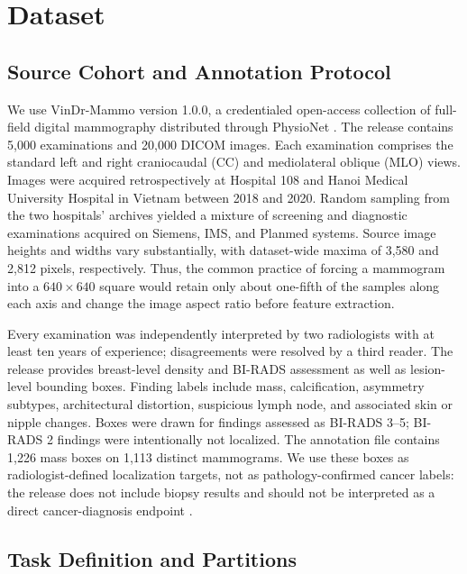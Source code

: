 \section{Dataset}
\label{sec:dataset}

\subsection{Source Cohort and Annotation Protocol}
\label{sec:dataset_source}

We use VinDr-Mammo version 1.0.0, a credentialed open-access collection of
full-field digital mammography distributed through PhysioNet
\cite{nguyen2023vindr,pham2022vindrphysionet}.  The release contains 5,000
examinations and 20,000 DICOM images.  Each examination comprises the standard
left and right craniocaudal (CC) and mediolateral oblique (MLO) views.  Images
were acquired retrospectively at Hospital 108 and Hanoi Medical University
Hospital in Vietnam between 2018 and 2020.  Random sampling from the two
hospitals' archives yielded a mixture of screening and diagnostic examinations
acquired on Siemens, IMS, and Planmed systems.  Source image heights and widths
vary substantially, with dataset-wide maxima of 3,580 and 2,812 pixels,
respectively.  Thus, the common practice of forcing a mammogram into a
$640\!\times\!640$ square would retain only about one-fifth of the samples
along each axis and change the image aspect ratio before feature extraction.

Every examination was independently interpreted by two radiologists with at
least ten years of experience; disagreements were resolved by a third reader.
The release provides breast-level density and BI-RADS assessment as well as
lesion-level bounding boxes.  Finding labels include mass, calcification,
asymmetry subtypes, architectural distortion, suspicious lymph node, and
associated skin or nipple changes.  Boxes were drawn for findings assessed as
BI-RADS 3--5; BI-RADS 2 findings were intentionally not localized.  The
annotation file contains 1,226 mass boxes on 1,113 distinct mammograms.  We use
these boxes as radiologist-defined localization targets, not as
pathology-confirmed cancer labels: the release does not include biopsy results
and should not be interpreted as a direct cancer-diagnosis endpoint
\cite{nguyen2023vindr}.

\subsection{Task Definition and Partitions}
\label{sec:dataset_task}


